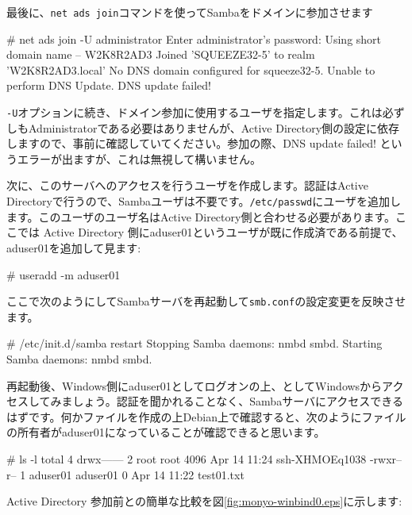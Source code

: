 \documentclass[mingoth,a4paper]{jsarticle}
\begin{document}
最後に、{\tt{net ads join}}コマンドを使ってSambaをドメインに参加させます

\begin{commandline}
# net ads join -U administrator
Enter administrator's password:
Using short domain name -- W2K8R2AD3
Joined 'SQUEEZE32-5' to realm 'W2K8R2AD3.local'
No DNS domain configured for squeeze32-5. Unable to perform DNS Update.
DNS update failed!
\end{commandline}

{\tt{-U}}オプションに続き、ドメイン参加に使用するユーザを指定します。これは必ずしもAdministratorである必要はありませんが、Active Directory側の設定に依存しますので、事前に確認していてください。参加の際、DNS update failed! というエラーが出ますが、これは無視して構いません。

次に、このサーバへのアクセスを行うユーザを作成します。認証はActive Directoryで行うので、Sambaユーザは不要です。{\tt{/etc/passwd}}にユーザを追加します。このユーザのユーザ名はActive Directory側と合わせる必要があります。ここでは Active Directory 側にaduser01というユーザが既に作成済である前提で、aduser01を追加して見ます:

\begin{commandline}
# useradd -m aduser01
\end{commandline}

ここで次のようにしてSambaサーバを再起動して{\tt{smb.conf}}の設定変更を反映させます。

\begin{commandline}
# /etc/init.d/samba restart
Stopping Samba daemons: nmbd smbd.
Starting Samba daemons: nmbd smbd.
\end{commandline}

再起動後、Windows側にaduser01としてログオンの上、{\yen}{\yen}{}{}{}{}としてWindowsからアクセスしてみましょう。認証を聞かれることなく、Sambaサーバにアクセスできるはずです。何かファイルを作成の上Debian上で確認すると、次のようにファイルの所有者がaduser01になっていることが確認できると思います。

\begin{commandline}
# ls -l
total 4
drwx------ 2 root     root     4096 Apr 14 11:24 ssh-XHMOEq1038
-rwxr--r-- 1 aduser01 aduser01    0 Apr 14 11:22 test01.txt
\end{commandline}

Active Directory 参加前との簡単な比較を図\ref{fig:monyo-winbind0.eps}に示します:
\end{document}
